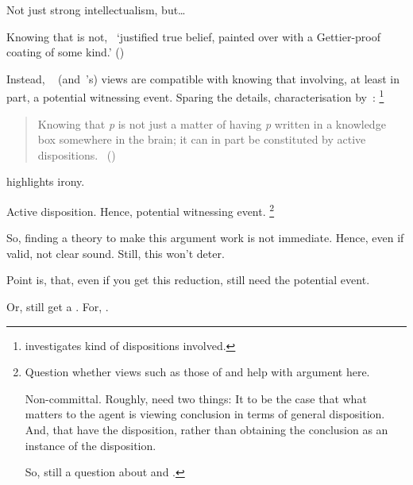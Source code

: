 \begin{note}
  Not just strong intellectualism, but\dots

  Knowing that is not,~\cite{Stalnaker:2012tp} `justiﬁed true belief, painted over with a Gettier-proof coating of some kind.' (\citeyear[754]{Stalnaker:2012tp})

  Instead, ~\citeauthor{Stanley:2011ut} (and~\citeauthor{Stalnaker:2012tp}'s) views are compatible with knowing that involving, at least in part, a potential witnessing event.
  Sparing the details, characterisation by~\citeauthor{Weatherson:2017tb}:%
  \footnote{
    \textcite{Weatherson:2017tb} investigates kind of dispositions involved.
  }

  \nocite{Stanley:2012wg}
  \begin{quote}
    Knowing that \emph{p} is not just a matter of having \emph{p} written in a knowledge box somewhere in the brain; it can in part be constituted by active dispositions.%
    \mbox{ }\hfill\mbox{(\citeyear[8]{Weatherson:2017tb})}
  \end{quote}

  \citeauthor{Stalnaker:2012tp} highlights irony.

  Active disposition.
  Hence, potential witnessing event.%
  \footnote{
    Question whether views such as those of \cite{Stalnaker:2012tp} and \citeauthor{Stanley:2011ut} help with argument here.

    Non-committal.
    Roughly, need two things:
    It to be the case that what matters to the agent is viewing conclusion in terms of general disposition.
    And, that have the disposition, rather than obtaining the conclusion as an instance of the disposition.

    So, still a question about \qzS{} and \qWhy{}.
  }
\end{note}

\begin{note}
  So, finding a theory to make this argument work is not immediate.
  Hence, even if valid, not clear sound.
  Still, this won't deter.
\end{note}

\begin{note}
  Point is, that, even if you get this reduction, still need the potential event.
\end{note}

\begin{note}
  Or, still get a \requ{}.
  For, \deadEnd{}.
\end{note}

